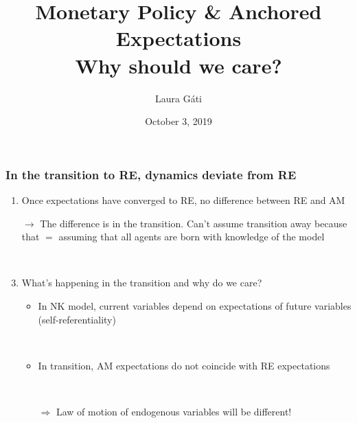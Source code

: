 \documentclass{beamer}
\author[]{Laura G\'ati}
\institute[]{Boston College}
\title[]{Monetary Policy \& Anchored Expectations \\
Why should we care?}
\date[]{October 3, 2019}
\begin{document}
\begin{frame}

\maketitle


\end{frame}



\begin{frame}
	\frametitle{In the transition to RE, dynamics deviate from RE}

\begin{enumerate}
\item Once expectations have converged to RE, no difference between RE and AM
\item[$\rightarrow$] The difference is in the transition. Can't assume transition away because that $=$ assuming that all agents are born with knowledge of the model

\


\item What's happening in the transition and why do we care?
\begin{itemize}
\item In NK model, current variables depend on expectations of future variables (self-referentiality)

\

\item In transition, AM expectations do not coincide with RE expectations

\

\item[$\Rightarrow$] Law of motion of endogenous variables will be different!
\end{itemize}

\end{enumerate}



\end{frame}
\end{document}
